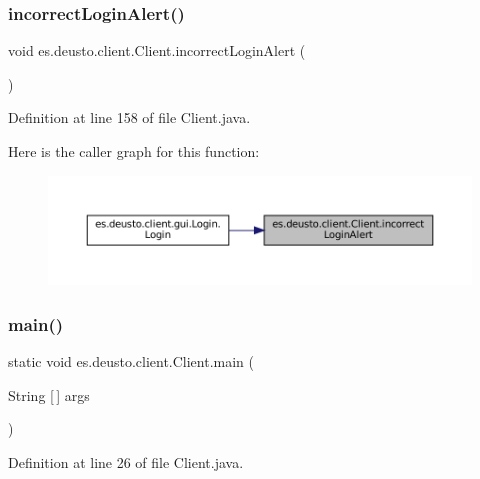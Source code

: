 \subsubsection{\texorpdfstring{incorrectLoginAlert()}{incorrectLoginAlert()}}
{\footnotesize\ttfamily void es.\+deusto.\+client.\+Client.\+incorrect\+Login\+Alert (\begin{DoxyParamCaption}{ }\end{DoxyParamCaption})}



Definition at line 158 of file Client.\+java.

Here is the caller graph for this function\+:
\nopagebreak
\begin{figure}[H]
\begin{center}
\leavevmode
\includegraphics[width=350pt]{classes_1_1deusto_1_1client_1_1_client_a8bbc4a71a4aaff50bfe419a724898790_icgraph}
\end{center}
\end{figure}
\mbox{\label{classes_1_1deusto_1_1client_1_1_client_a69a7526d0af9cb2341f4bf341b501152}} 
\subsubsection{\texorpdfstring{main()}{main()}}
{\footnotesize\ttfamily static void es.\+deusto.\+client.\+Client.\+main (\begin{DoxyParamCaption}\item[{String \mbox{[}$\,$\mbox{]}}]{args }\end{DoxyParamCaption})\hspace{0.3cm}{\ttfamily [static]}}



Definition at line 26 of file Client.\+java.

